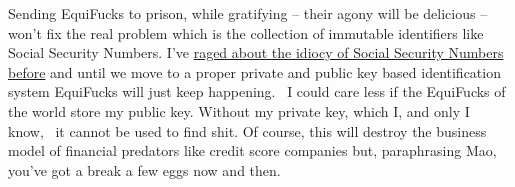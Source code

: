 Sending EquiFucks to prison, while gratifying -- their agony will be
delicious -- won't fix the real problem which is the collection of
immutable identifiers like Social Security Numbers. I've
\href{https://analyzethedatanotthedrivel.org/2015/05/17/social-security-numbers-are-broken-beyond-repair/}{raged
about the idiocy of Social Security Numbers before} and until we move to
a proper private and public key based identification system EquiFucks
will just keep happening.~ I could care less if the EquiFucks of the
world store my public key. Without my private key, which I, and only I
know,~ it cannot be used to find shit. Of course, this will destroy the
business model of financial predators like credit score companies but,
paraphrasing Mao, you've got a break a few eggs now and then.



%

